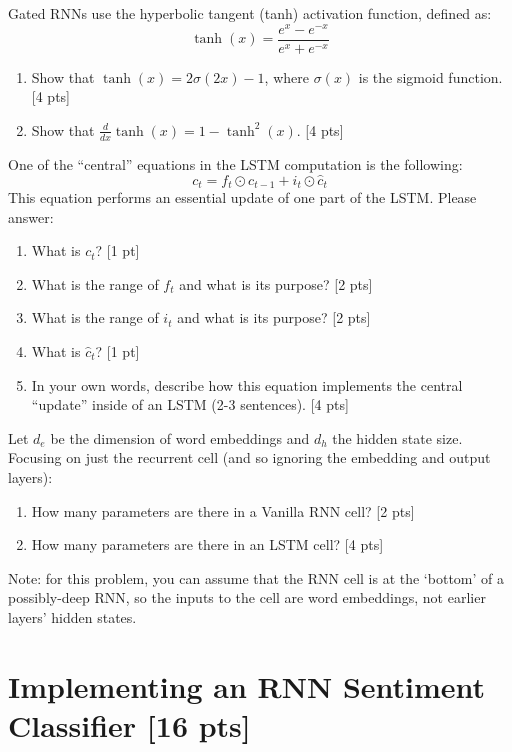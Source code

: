\documentclass[11pt]{article}
\begin{document}
\vspace{2em}
 Gated RNNs use the hyperbolic tangent (tanh) activation function, defined as:
\[ \tanh(x) = \frac{e^x - e^{-x}}{e^x + e^{-x}} \]
\begin{enumerate}[label=\alph*.]
  \item Show that $\tanh(x) = 2\sigma(2x) - 1$, where $\sigma(x)$ is the sigmoid function. [4 pts]
  \item Show that $\frac{d}{dx}\tanh(x) = 1 - \tanh^2(x)$. [4 pts]
\end{enumerate}

\vspace{2em}
  One of the ``central'' equations in the LSTM computation is the following:
\[ c_t = f_t \odot c_{t-1} + i_t \odot \hat{c}_t \]
This equation performs an essential update of one part of the LSTM.  Please answer:
\begin{enumerate}[label=\alph*.]
  \item What is $c_t$? [1 pt]
  \item What is the range of $f_t$ and what is its purpose? [2 pts]
  \item What is the range of $i_t$ and what is its purpose? [2 pts]
  \item What is $\hat{c}_t$? [1 pt]
  \item In your own words, describe how this equation implements the central ``update'' inside of an LSTM (2-3 sentences). [4 pts]
\end{enumerate}

\vspace{2em}
  Let $d_e$ be the dimension of word embeddings and $d_h$ the hidden state size.  Focusing on just the recurrent cell (and so ignoring the embedding and output layers):
\begin{enumerate}[label=\alph*.]
  \item How many parameters are there in a Vanilla RNN cell? [2 pts]
  \item How many parameters are there in an LSTM cell? [4 pts]
\end{enumerate}
Note: for this problem, you can assume that the RNN cell is at the `bottom' of a possibly-deep RNN, so the inputs to the cell are word embeddings, not earlier layers' hidden states.


\section{Implementing an RNN Sentiment Classifier [16 pts]}
\end{document}

